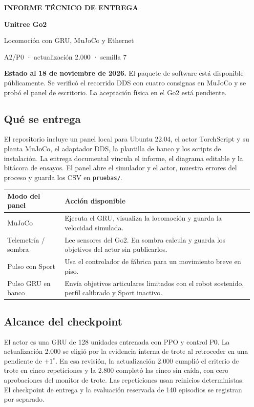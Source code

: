 \documentclass[11pt,a4paper]{article}
\newcommand{\statusbox}[1]{\colorbox{mist}{\parbox{\dimexpr\linewidth-2\fboxsep}{#1}}}
\begin{document}
\color{ink}
\vspace*{1.1em}
{\color{accent}\small\bfseries INFORME TÉCNICO DE ENTREGA\par}
\vspace{1.2em}
{\fontsize{38}{42}\selectfont\bfseries Unitree Go2\par}
\vspace{.55em}
{\Large Locomoción con GRU, MuJoCo y Ethernet\par}
\vspace{1.1em}
{\color{muted}A2/P0 · actualización 2.000 · semilla 7\par}
\vspace{2em}

\statusbox{\textbf{Estado al 18 de noviembre de 2026.} El paquete de software está disponible públicamente. Se verificó el recorrido DDS con cuatro consignas en MuJoCo y se probó el panel de escritorio. La aceptación física en el Go2 está pendiente.}

\vspace{.8em}
\subsection*{Qué se entrega}
El repositorio incluye un panel local para Ubuntu 22.04, el actor TorchScript y su planta MuJoCo, el adaptador DDS, la plantilla de banco y los scripts de instalación. La entrega documental vincula el informe, el diagrama editable y la bitácora de ensayos. El panel abre el simulador y el actor, muestra errores del proceso y guarda los CSV en \texttt{pruebas/}.

\begin{tabularx}{\linewidth}{@{}p{.24\linewidth}L@{}}
\toprule
\textbf{Modo del panel} & \textbf{Acción disponible} \\
\midrule
MuJoCo & Ejecuta el GRU, visualiza la locomoción y guarda la velocidad simulada. \\
Telemetría / sombra & Lee sensores del Go2. En sombra calcula y guarda los objetivos del actor sin publicarlos. \\
Pulso con Sport & Usa el controlador de fábrica para un movimiento breve en piso. \\
Pulso GRU en banco & Envía objetivos articulares limitados con el robot sostenido, perfil calibrado y Sport inactivo. \\
\bottomrule
\end{tabularx}

\vspace{.7em}
\subsection*{Alcance del checkpoint}
El actor es una GRU de 128 unidades entrenada con PPO y control P0. La actualización 2.000 se eligió por la evidencia interna de trote al retroceder en una pendiente de $+1^\circ$. En esa revisión, la actualización 2.000 cumplió el criterio de trote en cinco repeticiones y la 2.800 completó las cinco sin caída, con cero aprobaciones del monitor de trote. Las repeticiones usan reinicios deterministas. El checkpoint de entrega y la evaluación reservada de 140 episodios se registran por separado.
\end{document}
